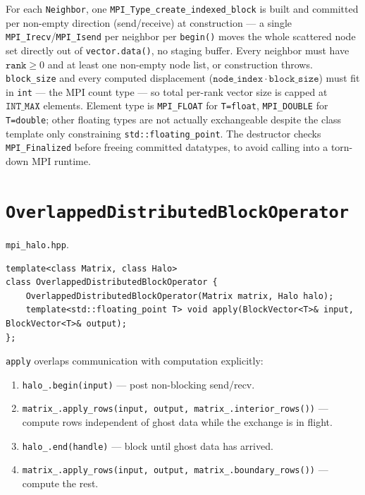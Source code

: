 \documentclass[11pt,a4paper]{report}
\begin{document}
For each \lstinline!Neighbor!, one \lstinline!MPI_Type_create_indexed_block! is
built and committed per non-empty direction (send/receive) at
construction --- a single \lstinline!MPI_Irecv!/\lstinline!MPI_Isend! per neighbor per
\lstinline!begin()! moves the whole scattered node set directly out of
\lstinline!vector.data()!, no staging buffer. Every neighbor must have
$\mathtt{rank} \geq 0$ and at least one non-empty node list, or
construction throws. \lstinline!block_size! and every computed displacement
($\mathtt{node\_index} \cdot \mathtt{block\_size}$) must fit in
\lstinline!int! --- the MPI count type --- so total per-rank vector size is
capped at $\mathtt{INT\_MAX}$ elements. Element type is \lstinline!MPI_FLOAT!
for \lstinline!T=float!, \lstinline!MPI_DOUBLE! for \lstinline!T=double!; other floating
types are not actually exchangeable despite the class template only
constraining \lstinline!std::floating_point!. The destructor checks
\lstinline!MPI_Finalized! before freeing committed datatypes, to avoid
calling into a torn-down MPI runtime.

\section{\texorpdfstring{\lstinline!OverlappedDistributedBlockOperator!}{OverlappedDistributedBlockOperator}}
\label{sec:8.2}

\texttt{mpi\_halo.hpp}.

\begin{lstlisting}
template<class Matrix, class Halo>
class OverlappedDistributedBlockOperator {
    OverlappedDistributedBlockOperator(Matrix matrix, Halo halo);
    template<std::floating_point T> void apply(BlockVector<T>& input, BlockVector<T>& output);
};
\end{lstlisting}

\lstinline!apply! overlaps communication with computation explicitly:

\begin{enumerate}
\item \lstinline!halo_.begin(input)! --- post non-blocking send/recv.
\item \lstinline!matrix_.apply_rows(input, output, matrix_.interior_rows())! ---
  compute rows independent of ghost data while the exchange is in
  flight.
\item \lstinline!halo_.end(handle)! --- block until ghost data has arrived.
\item \lstinline!matrix_.apply_rows(input, output, matrix_.boundary_rows())! ---
  compute the rest.
\end{enumerate}
\end{document}
